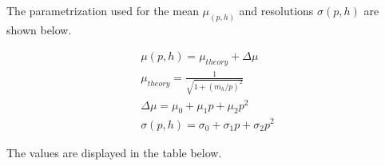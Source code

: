 
The parametrization used for the mean $\mu_ (p,h)$ and resolutions $\sigma (p,h)$ are shown below.

\begin{eqnarray}  
  \mu (p,h) = \mu_{theory} + \Delta \mu       \\
  \mu_{theory} = \frac{1}{\sqrt{1+(m_h/p)^2}} \\
  \Delta \mu = \mu_0 + \mu_1 p + \mu_2 p^2    \\
  \sigma (p,h) = \sigma_0 + \sigma_1 p + \sigma_2 p^2
\end{eqnarray}

The values are displayed in the table below. 

